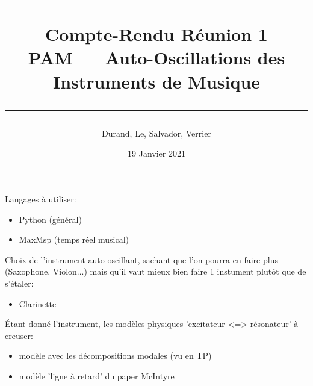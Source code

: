 \documentclass[a4paper, 11pt]{article}
\title{
	\noindent\rule{\linewidth}{0.4pt}
	\huge{Compte-Rendu Réunion 1\\}
	\medskip
	\Large{PAM --- Auto-Oscillations des Instruments de Musique}
	\noindent\rule{\linewidth}{1pt}
}
\author{Durand, Le, Salvador, Verrier}
\date{19 Janvier 2021}
\begin{document}
\maketitle

Langages à utiliser:
\begin{itemize}
\item Python (général)
\item MaxMsp (temps réel musical)
\end{itemize}

\bigskip

Choix de l'instrument auto-oscillant, sachant que l'on pourra en faire plus (Saxophone, Violon...) mais qu'il vaut mieux bien faire 1 instument plutôt que de s'étaler:
\begin{itemize}
\item Clarinette
\end{itemize}

\bigskip

Étant donné l'instrument, les modèles physiques 'excitateur <=> résonateur' à creuser:
\begin{itemize}
\item modèle avec les décompositions modales (vu en TP)
\item modèle 'ligne à retard' du paper McIntyre
\end{itemize}

\bigskip
\end{document}
